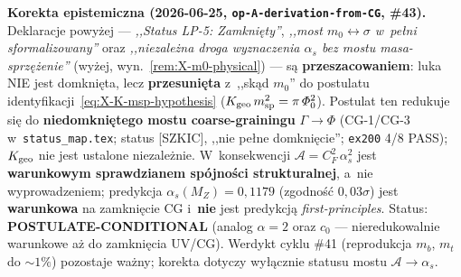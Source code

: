 \begin{remark}%
\label{rem:X-rescope-43}
\textbf{Korekta epistemiczna (2026-06-25, \texttt{op-A-derivation-from-CG}, \#43).}
Deklaracje powy\.zej --- \emph{,,Status LP-5: Zamkni\k{e}ty''}, \emph{,,most
$m_0 \leftrightarrow \sigma$ w~pe\l{}ni sformalizowany''} oraz \emph{,,niezale\.zna
droga wyznaczenia $\alpha_s$ bez mostu masa-sprz\k{e}\.zenie''} (wy\.zej,
wyn.~\ref{rem:X-m0-physical}) --- s\k{a} \textbf{przeszacowaniem}: luka NIE jest
domkni\k{e}ta, lecz \textbf{przesuni\k{e}ta} z~,,sk\k{a}d $m_0$'' do postulatu
identyfikacji~\eqref{eq:X-K-msp-hypothesis} ($K_{\rm geo}\,m_{\rm sp}^2 = \pi\,\varPhi_0^2$).
Postulat ten redukuje si\k{e} do \textbf{niedomkni\k{e}tego mostu coarse-grainingu}
$\Gamma\!\to\!\Phi$ (CG-1/CG-3 w~\texttt{status\_map.tex}; status [SZKIC],
,,nie pe\l{}ne domkni\k{e}cie''; \texttt{ex200} 4/8 PASS); $K_{\rm geo}$ nie jest
ustalone niezale\.znie.
W~konsekwencji $\mathcal{A} = C_F^2\,\alpha_s^2$ jest \textbf{warunkowym sprawdzianem
sp\'ojno\'sci strukturalnej}, a~nie wyprowadzeniem; predykcja $\alpha_s(M_Z)=0{,}1179$
(zgodno\'s\'c $0{,}03\sigma$) jest \textbf{warunkowa} na zamkni\k{e}cie CG i~\textbf{nie}
jest predykcj\k{a} \emph{first-principles}. Status: \textbf{POSTULATE-CONDITIONAL}
(analog $\alpha=2$ oraz $c_0$ --- nieredukowalnie warunkowe a\.z do zamkni\k{e}cia
UV/CG). Werdykt cyklu \#41 (reprodukcja $m_b$, $m_t$ do $\sim\!1\%$) pozostaje wa\.zny;
korekta dotyczy wy\l{}\k{a}cznie statusu mostu $\mathcal{A}\to\alpha_s$.
\end{remark}
